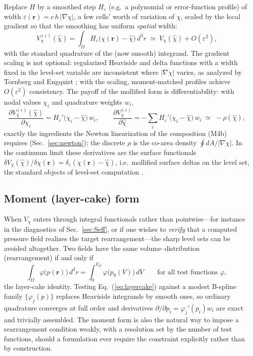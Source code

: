 \documentclass[english]{article}
\newcommand{\br}{\mathbf{r}}
\begin{document}
Replace $H$ by a smoothed step $H_\varepsilon$ (e.g.\ a polynomial or error-function profile) of
width $\varepsilon(\br)=c\,h\,|\nabla\chi|$, a few cells' worth of variation of $\chi$, scaled by
the local gradient so that the smoothing has uniform \emph{spatial} width:
\begin{equation}
V_\chi^{(\varepsilon)}(\hat\chi)=\int_\Omega H_\varepsilon\big(\chi(\br)-\hat\chi\big)\,d^3r
\;\simeq\;V_\chi(\hat\chi)+O(\varepsilon^{2}) ,
\label{eq:mollified_V}
\end{equation}
with the standard quadrature of the (now smooth) integrand. The gradient scaling is not optional:
regularized Heaviside and delta functions with a width fixed in the level-set variable are
inconsistent where $|\nabla\chi|$ varies, as analyzed by Tornberg and Engquist
\cite{tornberg2004}; with the scaling, moment-matched profiles achieve $O(\varepsilon^{2})$
consistency. The payoff of the mollified form is differentiability: with nodal values $\chi_i$
and quadrature weights $w_i$,
\begin{equation}
\frac{\partial V_\chi^{(\varepsilon)}(\hat\chi)}{\partial\chi_i}
=H_\varepsilon'\big(\chi_i-\hat\chi\big)\,w_i ,
\qquad
\frac{\partial V_\chi^{(\varepsilon)}}{\partial\hat\chi}
=-\sum_i H_\varepsilon'\big(\chi_i-\hat\chi\big)\,w_i\;\simeq\;-\rho(\hat\chi) ,
\label{eq:V_derivatives}
\end{equation}
exactly the ingredients the Newton linearization of the composition (M4b) requires
(Sec.~\ref{sec:newton}); the discrete $\rho$ is the co-area density
$\oint dA/|\nabla\chi|$. In the continuum limit these derivatives are the surface functionals
$\delta V_\chi(\hat\chi)/\delta\chi(\br)=\delta_\varepsilon(\chi(\br)-\hat\chi)$, i.e.\ mollified
surface deltas on the level set, the standard objects of level-set computation
\cite{osher_fedkiw}.

\subsection{Moment (layer-cake) form}
\label{sec:moments}

When $V_\chi$ enters through integral functionals rather than pointwise---for instance in the
diagnostics of Sec.~\ref{sec:Seff}, or if one wishes to \emph{verify} that a computed pressure
field realizes the target rearrangement---the sharp level sets can be avoided altogether. Two
fields have the same volume--distribution (rearrangement) if and only if
\begin{equation}
\int_\Omega\varphi\big(p(\br)\big)\,d^3r=\int_0^{V_\Omega}\varphi\big(p_0(V)\big)\,dV
\qquad\text{for all test functions }\varphi ,
\label{eq:layercake}
\end{equation}
the layer-cake identity. Testing Eq.~(\ref{eq:layercake}) against a modest B-spline family
$\{\varphi_j(p)\}$ replaces Heaviside integrands by smooth ones, so ordinary quadrature converges
at full order and derivatives $\partial/\partial p_i=\varphi_j'(p_i)w_i$ are exact and trivially
assembled. The moment form is also the natural way to impose a rearrangement condition weakly,
with a resolution set by the number of test functions, should a formulation ever require the
constraint explicitly rather than by construction.
\end{document}
